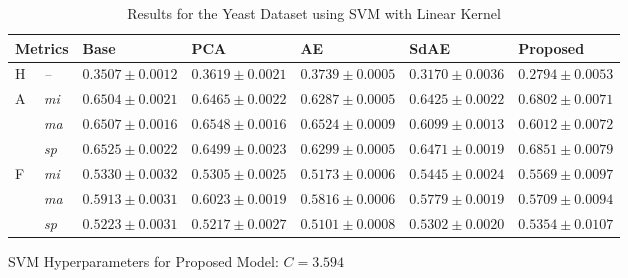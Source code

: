 \begin{table}[t]
    \footnotesize
    \centering
    \caption{Results for the Yeast Dataset using SVM with Linear Kernel}
    \label{results:yeast_lsvm_main}
    \begin{threeparttable}
    \begin{tabular}{@{}lllllll@{}}
    \toprule
    \multicolumn{2}{l}{Metrics}      & Base                 & PCA                  & AE                  & SdAE          & Proposed      \\ \midrule
    H     & \textit{--}               & $0.3507 \pm 0.0012$  & $0.3619  \pm 0.0021$ & $0.3739 \pm 0.0005$ & $0.3170 \pm 0.0036$ & $\mathbf{0.2794 \pm 0.0053}$ \\
    A     & \textit{mi}              & $0.6504 \pm 0.0021$  & $0.6465 \pm 0.0022$  & $0.6287 \pm 0.0005$ & $0.6425 \pm 0.0022$ & $\mathbf{0.6802 \pm 0.0071}$ \\
          & \textit{ma}              & $0.6507 \pm 0.0016$  & $\mathbf{0.6548 \pm 0.0016}$  & $0.6524 \pm 0.0009$ & $0.6099 \pm 0.0013$ & $0.6012 \pm 0.0072$ \\
          & \textit{sp}              & $0.6525 \pm 0.0022$  & $0.6499 \pm 0.0023$  & $0.6299 \pm 0.0005$ & $0.6471 \pm 0.0019$ & $\mathbf{0.6851 \pm 0.0079}$ \\
    F     & \textit{mi}              & $0.5330 \pm 0.0032$  & $0.5305 \pm 0.0025$  & $0.5173 \pm 0.0006$ & $0.5445 \pm 0.0024$ & $\mathbf{0.5569 \pm 0.0097}$ \\
          & \textit{ma}              & $0.5913 \pm 0.0031$  & $\mathbf{0.6023 \pm 0.0019}$  & $0.5816 \pm 0.0006$ & $0.5779 \pm 0.0019$ & $0.5709 \pm 0.0094$ \\
          & \textit{sp}              & $0.5223 \pm 0.0031$  & $0.5217 \pm 0.0027$  & $0.5101 \pm 0.0008$ & $0.5302 \pm 0.0020$ & $\mathbf{0.5354 \pm 0.0107}$ \\ \bottomrule
    \end{tabular}
    \begin{tablenotes}
      \item SVM Hyperparameters for Proposed Model: $C=3.594$
    \end{tablenotes}
   \end{threeparttable}
\end{table}
